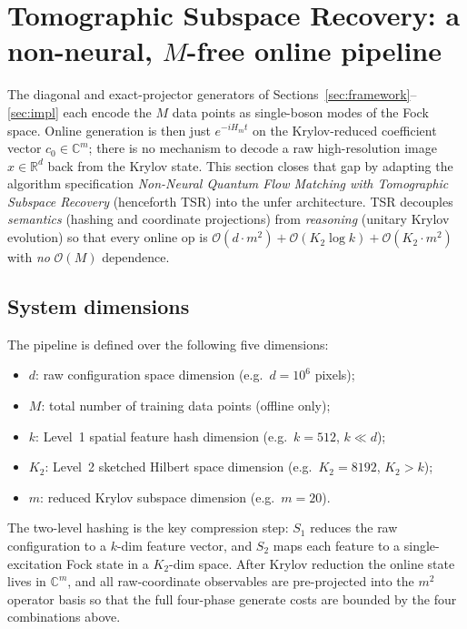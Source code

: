 \documentclass[11pt, a4paper]{article}
\newcommand{\Rset}{\mathbb{R}}
\newcommand{\Cset}{\mathbb{C}}
\begin{document}
\section{Tomographic Subspace Recovery: a non-neural,
\texorpdfstring{$M$}{M}-free online pipeline}
\label{sec:tomographic}

The diagonal and exact-projector generators of
Sections~\ref{sec:framework}--\ref{sec:impl} each encode the $M$ data points
as single-boson modes of the Fock space. Online generation is then
just $e^{-iH_m t}$ on the Krylov-reduced coefficient vector $c_0\in\Cset^m$;
there is no mechanism to decode a raw high-resolution image $x\in\Rset^d$
back from the Krylov state. This section closes that gap by adapting the
algorithm specification \emph{Non-Neural Quantum Flow Matching with Tomographic
Subspace Recovery} (henceforth TSR) into the unfer architecture. TSR
decouples \emph{semantics} (hashing and coordinate projections) from
\emph{reasoning} (unitary Krylov evolution) so that every online op is
$\mathcal{O}(d\cdot m^2)+\mathcal{O}(K_2\log k)+\mathcal{O}(K_2\cdot m^2)$
with \emph{no} $\mathcal{O}(M)$ dependence.

\subsection{System dimensions}

The pipeline is defined over the following five dimensions:
\begin{itemize}
\item $d$: raw configuration space dimension (e.g.\ $d=10^6$ pixels);
\item $M$: total number of training data points (offline only);
\item $k$: Level~1 spatial feature hash dimension (e.g.\ $k=512$, $k\ll d$);
\item $K_2$: Level~2 sketched Hilbert space dimension (e.g.\ $K_2=8192$, $K_2>k$);
\item $m$: reduced Krylov subspace dimension (e.g.\ $m=20$).
\end{itemize}
The two-level hashing is the key compression step: $S_1$ reduces the raw
configuration to a $k$-dim feature vector, and $S_2$ maps each feature to a
single-excitation Fock state in a $K_2$-dim space. After Krylov reduction the
online state lives in $\Cset^m$, and all raw-coordinate observables are
pre-projected into the $m^2$ operator basis so that the full four-phase
generate costs are bounded by the four combinations above.
\end{document}
